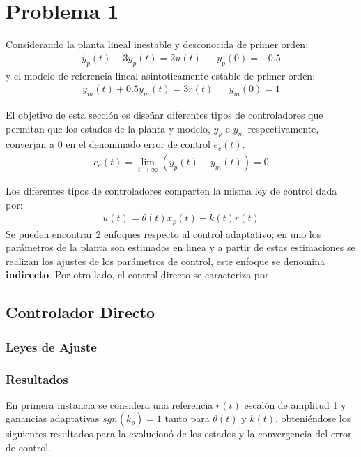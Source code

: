 \section{Problema 1}
Considerando la planta lineal inestable y desconocida de primer orden:
\begin{align}
    \dot{y_{p}}(t)-3y_{p}(t)=2u(t)&&y_{p}(0)=-0.5
\end{align}
y el modelo de referencia lineal asintoticamente estable de primer orden:
\begin{align}
     \dot{y_{m}}(t)+0.5y_{m}(t)=3r(t)&&y_{m}(0)=1
\end{align}

El objetivo de esta sección es diseñar diferentes tipos de controladores que permitan que los estados de la planta y modelo, $y_{p}$ e $y_{m}$ respectivamente, converjan a 0 en el denominado error de control $e_{c}(t)$.
\begin{align}
    e_{c}(t)=\lim_{t\rightarrow\infty}(y_{p}(t)-y_{m}(t))=0
\end{align}

Los diferentes tipos de controladores comparten la misma ley de control dada por:
\begin{align}
    u(t)=\theta(t)x_{p}(t)+k(t)r(t)
\end{align}
Se pueden encontrar 2 enfoques respecto al control adaptativo; en uno los parámetros de la planta son estimados en linea y a partir de estas estimaciones se realizan los ajustes de los parámetros de control, este enfoque se denomina \textbf{indirecto}. Por otro lado, el control directo se caracteriza por 





\subsection{Controlador Directo}
\subsubsection{Leyes de Ajuste }

\subsubsection{Resultados}
En primera instancia se considera una referencia $r(t)$ escalón de amplitud 1 y ganancias adaptativas $sgn(k_{p})=1$ tanto para $\theta(t)$ y $k(t)$, obteniéndose los siguientes resultados para la evolucionó de los estados y la convergencia del error de control.


